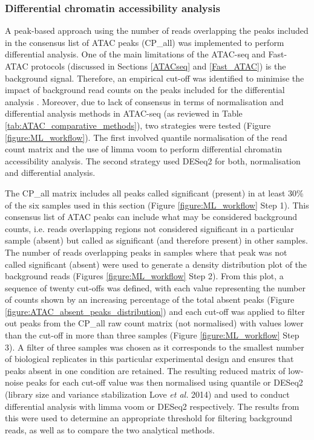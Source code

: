 

\subsubsection{Differential chromatin accessibility analysis}

A peak-based approach using the number of reads overlapping the peaks included in the consensus list of ATAC peaks (CP\_all) was implemented to perform differential analysis. One of the main limitations of the ATAC-seq and Fast-ATAC protocols (discussed in Sections \ref{ATACseq} and \ref{Fast_ATAC}) is the background signal. Therefore, an empirical cut-off was identified to minimise the impact of background read counts on the peaks included for the differential analysis \parencite{Xinmin2005,Jonker2014}. Moreover, due to lack of consensus in terms of normalisation and differential analysis methods in ATAC-seq (as reviewed in Table \ref{tab:ATAC_comparative_methods}), two strategies were tested (Figure \ref{figure:ML_workflow}). The first involved quantile normalisation of the read count matrix and the use of limma voom to perform differential chromatin accessibility analysis. The second strategy used DESeq2 for both, normalisation and differential analysis.

The CP\_all matrix includes all peaks called significant (present) in at least 30\% of the six samples used in this section (Figure \ref{figure:ML_workflow} Step 1). This consensus list of ATAC peaks can include what may be considered background counts, i.e. reads overlapping regions not considered significant in a particular sample (absent) but called as significant (and therefore present) in other samples. The number of reads overlapping peaks in samples where that peak was not called significant (absent) were used to generate a density distribution plot of the background reads (Figures \ref{figure:ML_workflow} Step 2). From this plot, a sequence of twenty cut-offs was defined, with each value representing the number of counts shown by an increasing percentage of the total absent peaks (Figure \ref{figure:ATAC_absent_peaks_distribution}) and each cut-off was applied to filter out peaks from the CP\_all raw count matrix (not normalised) with values lower than the cut-off in more than three samples (Figure \ref{figure:ML_workflow} Step 3). A filter of three samples was chosen as it corresponds to the smallest number of biological replicates in this particular experimental design and ensures that peaks absent in one condition are retained. The resulting reduced matrix of low-noise peaks for each cut-off value was then normalised using quantile or DESeq2 (library size and variance stabilization Love \textit{et al.} 2014) and used to conduct differential analysis with limma voom or DESeq2 respectively. The results from this were used to determine an appropriate threshold for filtering background reads, as well as to compare the two analytical methods. 


